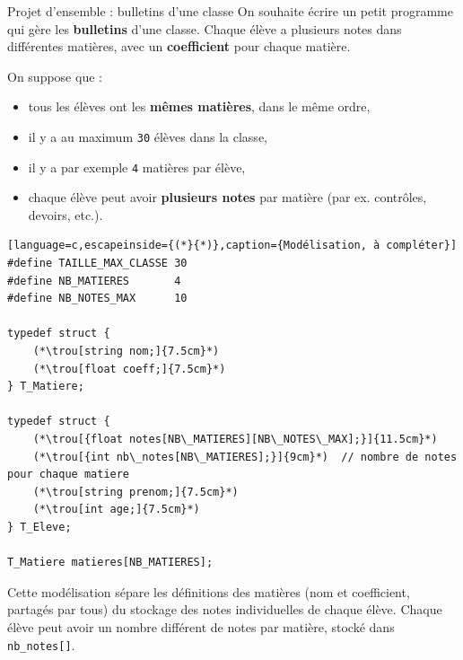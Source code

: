 
\begin{UPSTIexercice}{Projet d'ensemble : bulletins d'une classe}
    On souhaite écrire un petit programme qui gère les \textbf{bulletins} d'une classe.
    Chaque élève a plusieurs notes dans différentes matières, avec un \textbf{coefficient}
    pour chaque matière.

    On suppose que :
    \begin{itemize}
        \item tous les élèves ont les \textbf{mêmes matières}, dans le même ordre,
        \item il y a au maximum \texttt{30} élèves dans la classe,
        \item il y a par exemple \texttt{4} matières par élève,
        \item chaque élève peut avoir \textbf{plusieurs notes} par matière (par ex. contrôles, devoirs, etc.).
    \end{itemize}


    \begin{lstlisting}[language=c,escapeinside={(*}{*)},caption={Modélisation, à compléter}]
#define TAILLE_MAX_CLASSE 30
#define NB_MATIERES       4
#define NB_NOTES_MAX      10

typedef struct {
    (*\trou[string nom;]{7.5cm}*)
    (*\trou[float coeff;]{7.5cm}*)
} T_Matiere;

typedef struct {
    (*\trou[{float notes[NB\_MATIERES][NB\_NOTES\_MAX];}]{11.5cm}*)
    (*\trou[{int nb\_notes[NB\_MATIERES];}]{9cm}*)  // nombre de notes pour chaque matiere
    (*\trou[string prenom;]{7.5cm}*)
    (*\trou[int age;]{7.5cm}*)
} T_Eleve;

T_Matiere matieres[NB_MATIERES];
\end{lstlisting}

    Cette modélisation sépare les définitions des matières (nom et coefficient, partagés par tous)
    du stockage des notes individuelles de chaque élève. Chaque élève peut avoir un nombre
    différent de notes par matière, stocké dans \texttt{nb\_notes[]}.



\end{UPSTIexercice}
